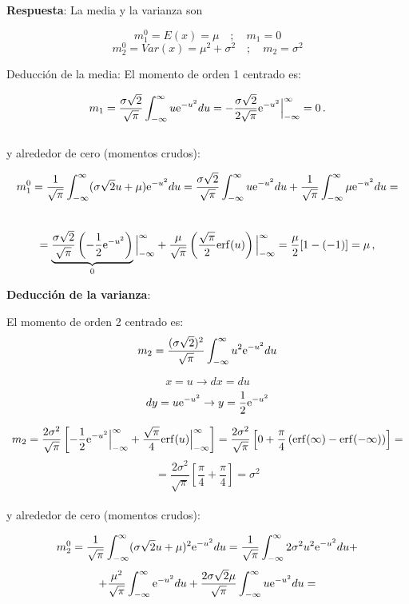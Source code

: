 \documentclass[
]{agujournal2019}
\begin{document}
\textbf{Respuesta}: La media y la varianza son

\[m^0_1=E(x)=\mu\,\,\,\,\,\,;\,\,\,\,\,\,m_1=0\]
\[m^0_2=Var(x)=\mu^2 + \sigma^2\,\,\,\,\,\,;\,\,\,\,\,\,m_2=\sigma^2\]

\vspace{0.25cm}

Deducción de la media: El momento de orden 1 centrado es:

\[m_1=\frac{\sigma\sqrt{2}}{\sqrt{\pi}}\int^{\infty}_{-\infty}u{\rm e}
   ^{-u^2}du=-\frac{\sigma\sqrt{2}}{2\sqrt{\pi}}{\rm e}
   ^{-u^2}\Big|^{\infty}_{-\infty}=0\,.\]\\
y alrededor de cero (momentos crudos):

\[m^0_1=\frac{1}{\sqrt{\pi}}\int^{\infty}_{-\infty}(\sigma \sqrt{2} u + \mu){\rm e}
   ^{-u^2}du=\frac{\sigma\sqrt{2}}{\sqrt{\pi}}\int^{\infty}_{-\infty}u{\rm e}
   ^{-u^2}du + \frac{1}{\sqrt{\pi}}\int^{\infty}_{-\infty}\mu{\rm e}
   ^{-u^2}du=\]\\
\[=\underbrace{\frac{\sigma\sqrt{2}}{\sqrt{\pi}}\left( -\frac{1}{2}{\rm e}
   ^{-u^2}\right)}_{0} \Big|^{\infty}_{-\infty}+
   \frac{\mu}{\sqrt{\pi}}\left( \frac{\sqrt{\pi}}{2}{\rm erf}(u)\right) \Big|^{\infty}_{-\infty}=
   \frac{\mu}{2}[1-(-1)]=\mu\,,\]

\vspace{0.25cm}

\textbf{Deducción de la varianza}:

El momento de orden 2 centrado es:\\

\[m_2=\frac{(\sigma\sqrt{2})^2}{\sqrt{\pi}}\int^{\infty}_{-\infty}u^2{\rm e}^{-u^2}du\]

\[x=u \rightarrow dx=du\]
\[dy=u{\rm e}^{-u^2} \rightarrow y=\frac{1}{2}{\rm e}^{-u^2}\]

\[m_2=\frac{2\sigma^2}{\sqrt{\pi}}\left[ -\frac{1}{2}{\rm e}^{-u^2}
      \Big|^{\infty}_{-\infty} +\frac{\sqrt{\pi}}{4} {\rm erf}(u)\Big|^{\infty}_{-\infty}\right]=
  \frac{2\sigma^2}{\sqrt{\pi}}\left[0 + \frac{\pi}{4}\left({\rm erf}(\infty) - {\rm erf}(-\infty) \right)
  \right]=\]
\[=\frac{2\sigma^2}{\sqrt{\pi}}\left[ \frac{\pi}{4}+\frac{\pi}{4}\right]=\sigma^2\]\\

y alrededor de cero (momentos crudos):

\[m^0_2=\frac{1}{\sqrt{\pi}}\int^{\infty}_{-\infty}(\sigma \sqrt{2} u + \mu)^2{\rm e}^{-u^2}du=
   \frac{1}{\sqrt{\pi}}\int^{\infty}_{-\infty}2\sigma^2 u^2{\rm e}^{-u^2}du +\]
\[ +\frac{\mu^2}{\sqrt{\pi}}\int^{\infty}_{-\infty}{\rm e}^{-u^2}du
   +\frac{2\sigma\sqrt{2}\mu}{\sqrt{\pi}}\int^{\infty}_{-\infty}u{\rm e}^{-u^2}du=\]
\end{document}
